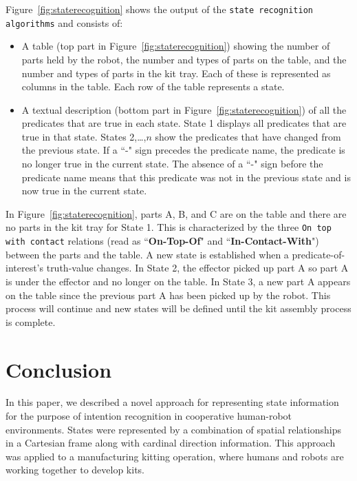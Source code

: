 \documentclass[preprint,12pt]{elsarticle}
\begin{document}
Figure~\ref{fig:staterecognition} shows the output of the \texttt{state recognition algorithms} and consists of:
\begin{itemize}
 \item A table (top part in Figure~\ref{fig:staterecognition}) showing the number of parts held by the robot, the number and types of parts on the table, and the number and types of parts in the kit tray. Each of these is represented as columns in the table. Each row of the table represents a state.
 \item A textual description (bottom part in Figure~\ref{fig:staterecognition}) of all the predicates that are true in each state. State 1 displays all predicates that are true in that state. States 2,\ldots,$n$ show the predicates that have changed from the previous state. If a ``-" sign precedes the predicate name, the predicate is no longer true in the current state. The absence of a ``-" sign before the predicate name means that this predicate was not in the previous state and is now true in the current state.
\end{itemize}

In Figure~\ref{fig:staterecognition}, parts A, B, and C are on the table and there are no parts in the kit tray for State 1. This is characterized by the three \texttt{On top with contact} relations (read as ``\textbf{On-Top-Of}" and ``\textbf{In-Contact-With}") between the parts and the table. A new state is established when a predicate-of-interest's truth-value changes. In State 2, the effector picked up part A so part A is under the effector and no longer on the table. In State 3, a new part A appears on the table since the previous part A has been picked up by the robot. This process will continue and new states will be defined until the kit assembly process is complete.



\section{Conclusion}\label{S:section6}
In this paper, we described a novel approach for representing state information for the purpose of intention recognition in cooperative human-robot environments. States were represented by a combination of spatial relationships in a Cartesian frame along with cardinal direction information. This approach was applied to a manufacturing kitting operation, where humans and robots are working together to develop kits.
\end{document}

